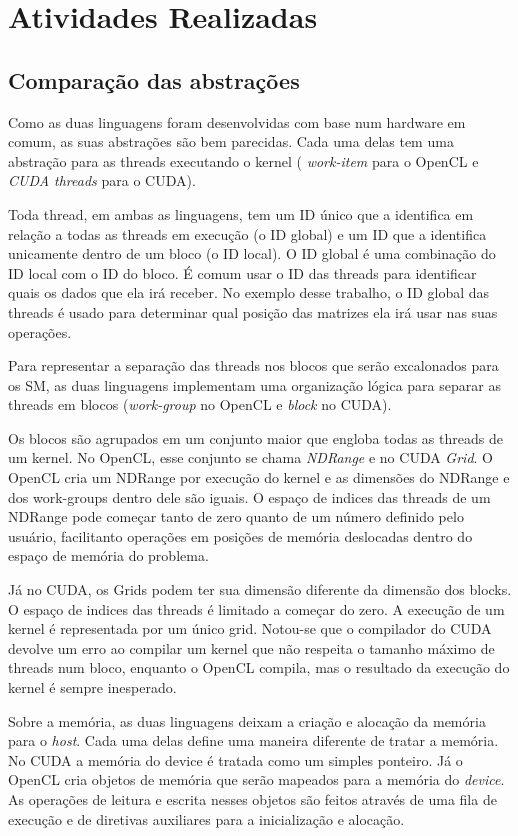 \section{Atividades Realizadas}
\subsection{Comparação das abstrações}
Como as duas linguagens foram desenvolvidas com base num hardware em comum, as suas abstrações são bem parecidas. 
Cada uma delas tem uma abstração para as threads executando o kernel ( \textit{work-item} para o OpenCL e \textit{CUDA threads} para o CUDA). 

Toda thread, em ambas as linguagens, tem um ID único que a identifica em relação a todas as threads em execução (o ID global) 
e um ID que a identifica unicamente dentro de um bloco (o ID local). O ID global é uma combinação do ID local com o ID do bloco. 
É comum usar o ID das threads para identificar quais os dados que ela irá receber. No exemplo desse trabalho, o ID 
global das threads é usado para determinar qual posição das matrizes ela irá usar nas suas operações. 

Para representar a separação das threads nos blocos que serão excalonados para os SM, as duas linguagens implementam uma organização
lógica para separar as threads em blocos (\textit{work-group} no OpenCL e \textit{block} no CUDA).

Os blocos são agrupados em um conjunto maior que engloba todas as threads de um kernel.
No OpenCL, esse conjunto se chama \textit{NDRange} e no CUDA \textit{Grid}. O OpenCL cria um NDRange por execução do kernel
e as dimensões do NDRange e dos work-groups dentro dele são iguais. O espaço de indices das threads de um NDRange pode começar 
tanto de zero quanto de um número definido pelo usuário, facilitanto operações em posições de memória deslocadas dentro 
do espaço de memória do problema.
	
Já no CUDA, os Grids podem ter sua dimensão diferente da dimensão dos blocks. O espaço de indices das threads é limitado a começar 
do zero. A execução de um kernel é representada por um único grid. Notou-se que o compilador do CUDA devolve um erro ao compilar um kernel
que não respeita o tamanho máximo de threads num bloco, enquanto o OpenCL compila, mas o resultado da execução do kernel é sempre
inesperado.

Sobre a memória, as duas linguagens deixam a criação e alocação da memória para o \textit{host}. Cada uma delas define uma maneira
diferente de tratar a memória. No CUDA a memória do device é tratada como um simples ponteiro. Já o OpenCL cria objetos de memória que serão
mapeados para a memória do \textit{device}. As operações de leitura e escrita nesses objetos são feitos através de uma fila de 
execução e de diretivas auxiliares para a inicialização e alocação.

